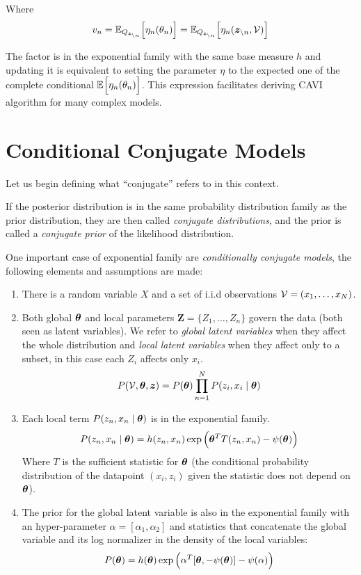 Where
\[
  v_{n} = \mathbb{E}_{Q_{\bm{z}_{\backslash n}}}\Big[\eta_{n}(\theta_{n})\Big] =  \mathbb{E}_{Q_{\bm{z}_{\backslash n}}}\Big[\eta_{n}(\bm{z}_{\backslash n}, \mathcal{V})\Big]
\]

The factor is in the exponential family with the same base measure \(h\) and updating it is equivalent to setting the parameter \(\eta\) to the expected one of the complete conditional \(\mathbb{E}_{}\Big[\eta_{n}(\theta_{n})\Big]\). This expression facilitates deriving CAVI algorithm for many complex models.

\section{Conditional Conjugate Models}

Let us begin defining what ``conjugate'' refers to in this context.

\begin{definition}
If the posterior distribution is in the same probability distribution family as
the prior distribution, they are then called \emph{conjugate distributions}, and
the prior is called a \emph{conjugate prior} of the likelihood distribution.
\end{definition}

One important case of exponential family are \emph{conditionally conjugate models}, the following elements and assumptions are made:
\begin{enumerate}
  \item There is a random variable \(X\) and a set of i.i.d observations \(\mathcal{V} = (x_{1}, \dots, x_{N})\).
  \item Both global \(\bm{\theta}\) and local parameters \(\bm{Z} = \{Z_{1}, \dots, Z_{n}\}\) govern the data (both seen as latent variables). We refer to \emph{global latent variables} when they affect the whole distribution and \emph{local latent variables} when they affect only to a subset, in this case each \(Z_{i}\) affects only \(x_{i}\).
    \[
    P(\mathcal{V}, \bm{\theta}, \bm{z}) = P(\bm{\theta})\prod_{n=1}^{N}P(z_{i}, x_{i} \mid \bm{\theta})
    \]
  \item Each local term \(P(z_{n},x_{n} \mid \bm{\theta})\) is in the exponential family.
    \[
  P(z_{n},x_{n} \mid \bm{\theta}) = h(z_{n}, x_{n}) \exp \Big( \bm{\theta}^{T} T(z_{n}, x_{n}) - \psi(\bm{\theta}) \Big)
    \]
    Where \(T\) is the sufficient statistic for \(\bm{\theta}\) (the conditional probability distribution of the datapoint \((x_{i}, z_{i})\) given the statistic does not depend on \(\bm{\theta}\)). 
  \item The prior for the global latent variable is also in the exponential family with an hyper-parameter \(\alpha = [\alpha_{1}, \alpha_{2}]\) and statistics that concatenate the global variable and its log normalizer in the density of the local variables:
    \[
    P(\bm{\theta}) = h(\bm{\theta}) \exp \Big( \alpha^{T}[\bm{\theta}, -\psi(\bm{\theta})] - \psi(\alpha)\Big)
    \]
\end{enumerate}

